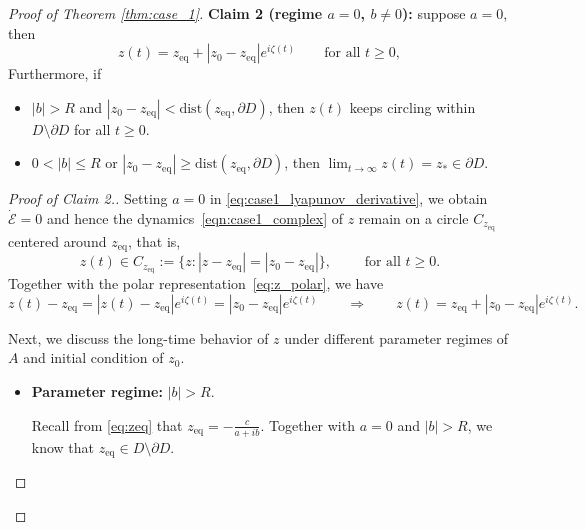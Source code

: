 \documentclass[10pt]{article}
\theoremstyle{definition}
\theoremstyle{definition}
\numberwithin{equation}{section}
\newcommand{\CE}{\mathcal{E}}
\newcommand{\zeq}{z_{\mathrm{eq}}}
\begin{document}
\begin{proof}[Proof of Theorem \ref{thm:case_1}]
   
    \textbf{Claim 2 (regime $a = 0$, $b \neq 0$):} suppose $a = 0$, then  
    \[
        z(t)=z_{\mathrm{eq}}+|z_0-z_{\mathrm{eq}}|e^{i\zeta(t)}
        \qquad \text{for all } t\ge0,
    \]
    Furthermore, if 
    \begin{itemize}
        \item $|b| > R$ and $|z_0 - z_\mathrm{eq}| < \mathrm{dist}(z_\mathrm{eq}, \partial D)$, 
        then $z(t)$ keeps circling within $D \setminus \partial D$ for all $t \geq 0$.
        
        \item $0 < |b| \leq R$ or $|z_0 - z_\mathrm{eq}| \geq \mathrm{dist}(z_\mathrm{eq}, \partial D)$, then $\lim_{t \to \infty} z(t) = z_* \in \partial D$.
    \end{itemize}

    \begin{proof}[Proof of Claim 2.]
        Setting $a = 0$ in \eqref{eq:case1_lyapunov_derivative}, we obtain $\dot{\CE} = 0$ and hence the dynamics~\eqref{eqn:case1_complex} of $z$ remain on a circle $C_{\zeq}$ centered around $z_\mathrm{eq}$, that is,
        \begin{equation}\label{eq:circle_Cz}
             z(t) \in C_{\zeq} := \{ z: |z - z_{\mathrm{eq}}| = |z_0 - z_{\mathrm{eq}}| \}, \qquad \text{ for all } t \geq 0.
        \end{equation}
        Together with the polar representation~\eqref{eq:z_polar}, we have
        \begin{equation*}
        z(t) - \zeq = |z(t) - \zeq| e^{i\zeta(t)} = |z_0 - \zeq| e^{i\zeta(t)} \qquad \Longrightarrow \qquad z(t) = \zeq + |z_0 - \zeq| e^{i\zeta(t)} .
        \end{equation*}
        
        Next, we discuss the long-time behavior of $z$ under different parameter regimes of $A$ and initial condition of $z_0$.
        
        \begin{itemize}
            \item \textbf{Parameter regime:} $|b| > R$.
            
            Recall from \eqref{eq:zeq} that $\zeq = -\frac{c}{a + i b}$. 
            Together with $a=0$ and $|b| > R$, we know that $\zeq \in D \setminus \partial D$.


\end{itemize}
\end{proof}
\end{proof}
\end{document}
